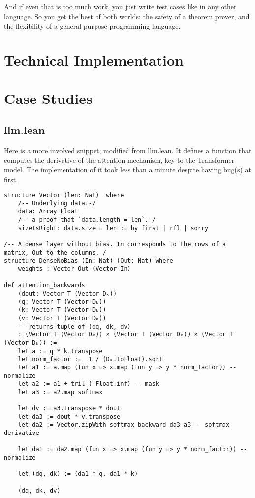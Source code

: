 \documentclass{article}
\begin{document}
And if even that is too much work, you just write test cases like in any other language. So you get the best of both worlds: the safety of a theorem prover, and the flexibility of a general purpose programming language.

\section{Technical Implementation}

\section{Case Studies}
\subsection{llm.lean}
Here is a more involved snippet, modified from llm.lean. It defines a function that computes the derivative of the attention mechanism, key to the Transformer model. The implementation of it took less than a minute despite having bug(s) at first.

\begin{verbatim}
structure Vector (len: Nat)  where
    /-- Underlying data.-/
    data: Array Float
    /-- a proof that `data.length = len`.-/
    sizeIsRight: data.size = len := by first | rfl | sorry

/-- A dense layer without bias. In corresponds to the rows of a matrix, Out to the columns.-/
structure DenseNoBias (In: Nat) (Out: Nat) where
    weights : Vector Out (Vector In)

def attention_backwards
    (dout: Vector T (Vector Dₖ))
    (q: Vector T (Vector Dₖ))
    (k: Vector T (Vector Dₖ))
    (v: Vector T (Vector Dₖ))
    -- returns tuple of (dq, dk, dv)
    : (Vector T (Vector Dₖ)) × (Vector T (Vector Dₖ)) × (Vector T (Vector Dₖ)) :=
    let a := q * k.transpose
    let norm_factor :=  1 / (Dₖ.toFloat).sqrt
    let a1 := a.map (fun x => x.map (fun y => y * norm_factor)) -- normalize
    let a2 := a1 + tril (-Float.inf) -- mask
    let a3 := a2.map softmax

    let dv := a3.transpose * dout
    let da3 := dout * v.transpose
    let da2 := Vector.zipWith softmax_backward da3 a3 -- softmax derivative

    let da1 := da2.map (fun x => x.map (fun y => y * norm_factor)) -- normalize

    let (dq, dk) := (da1 * q, da1 * k)

    (dq, dk, dv)
\end{verbatim}
\end{document}

